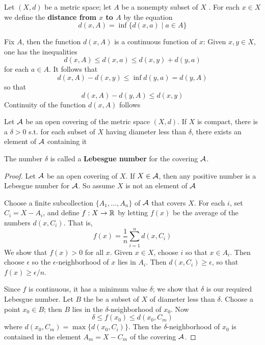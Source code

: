 \documentclass[11pt]{article}
\begin{document}
\begin{definition}[]
Let \((X,d)\) be a metric space; let \(A\) be a nonempty subset of \(X\) . For each \(x\in X\) we
define the \textbf{distance from \(x\) to \(A\)} by the equation
\begin{equation*}
d(x,A)=\inf\{d(x,a)\mid a\in A\}
\end{equation*}
\end{definition}

Fix \(A\), then the function \(d(x,A)\) is a continuous function of \(x\): Given \(x,y\in X\), one
has the inequalities
\begin{equation*}
d(x,A)\le d(x,a)\le d(x,y)+d(y,a)
\end{equation*}
for each \(a\in A\). It follows that
\begin{equation*}
d(x,A)-d(x,y)\le\inf d(y,a)=d(y,A)
\end{equation*}
so that
\begin{equation*}
d(x,A)-d(y,A)\le d(x,y)
\end{equation*}
Continuity of the function \(d(x,A)\) follows

\begin{lemma}
Let \(\mathcal{A}\) be an open covering of the metric space \((X,d)\). If \(X\) is compact, there is
a \(\delta>0\) s.t. for each subset of \(X\) having diameter less than \(\delta\), there exists an element
of \(\mathcal{A}\) containing it
\end{lemma}

The number \(\delta\) is called a \textbf{Lebesgue number} for the covering \(\mathcal{A}\).

\begin{proof}
Let \(\mathcal{A}\) be an open covering of \(X\). If \(X\in\mathcal{A}\), then any positive number is a Lebesgue number
for \(\mathcal{A}\). So assume \(X\) is not an element of \(\mathcal{A}\)

Choose a finite subcollection \(\{A_1,\dots,A_n\}\) of \(\mathcal{A}\) that covers \(X\). For each \(i\),
set \(C_i=X-A_i\), and define \(f:X\to\mathbb{R}\) by letting \(f(x)\) be the average of the
numbers \(d(x,C_i)\). That is,
\begin{equation*}
f(x)=\frac{1}{n}\sum_{i=1}^nd(x,C_i)
\end{equation*}
We show that \(f(x)>0\) for all \(x\). Given \(x\in X\), choose \(i\) so that \(x\in A_i\). Then
choose \(\epsilon\) so the \(\epsilon\)-neighborhood of \(x\) lies in \(A_i\). Then \(d(x,C_i)\ge\epsilon\), so that \(f(x)\ge\epsilon/n\).

Since \(f\) is continuous, it has a minimum value \(\delta\); we show that \(\delta\) is our required Lebesgue
number. Let \(B\) the be a subset of \(X\) of diameter less than \(\delta\). Choose a point \(x_0\in B\);
then \(B\) lies in the \(\delta\)-neighborhood of \(x_0\). Now
\begin{equation*}
\delta\le f(x_0)\le d(x_0,C_m)
\end{equation*}
where \(d(x_0,C_m)=\max\{d(x_0,C_i)\}\). Then the \(\delta\)-neighborhood of \(x_0\) is contained in the
element \(A_m=X-C_m\) of the covering \(\mathcal{A}\).
\end{proof}
\end{document}
